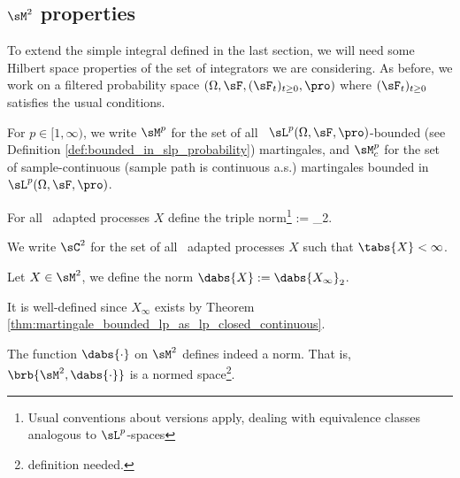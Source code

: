 \subsection{$\sM^2$ properties}

To extend the simple integral defined in the last section, we will need some Hilbert space properties of the set of integrators we are considering. As before, we work on a filtered probability space $(\Omega,\sF,
(\sF_t)_{t\geq0},\pro)$ where $(\sF_t)_{t\geq0}$ satisfies the usual conditions.

\begin{definition}[$\sM^p$ and $\sM^p_c$]\label{def:martingale_space_bounded_in_lp}
For $p\in [1,\infty)$, we write $\sM^p$ for the set of all \cadlag\ $\sL^p(\Omega,\sF,\pro)$-bounded (see Definition \ref{def:bounded_in_slp_probability}) martingales, and $\sM^p_c$ for the set of sample-continuous (sample path is continuous a.s.) martingales bounded in $\sL^p(\Omega,\sF,\pro)$. %
\end{definition}


\begin{definition}\label{def:triple_norm_process}
For all \cadlag\ adapted processes $X$ define the triple norm\footnote{Usual conventions about versions apply, dealing with equivalence classes analogous to $\sL^p$-spaces} \be {} := _2.
\ee
\end{definition}

\begin{definition}[$\sC^2$]
We write $\sC^2$ for the set of all \cadlag\ adapted processes $X$ such that $\tabs{X} < \infty$.
\end{definition}


\begin{definition}\label{def:double_norm_process}
Let $X\in \sM^2$, we define the norm $\dabs{X} := \dabs{X_\infty}_2$.
\end{definition}

\begin{remark}
It is well-defined since $X_\infty$ exists by Theorem \ref{thm:martingale_bounded_lp_as_lp_closed_continuous}.
\end{remark}

\begin{theorem}
The function $\dabs{\cdot}$ on $\sM^2$ defines indeed a norm. That is, $\brb{\sM^2,\dabs{\cdot}}$ is a normed space\footnote{definition needed.}.
\end{theorem}

